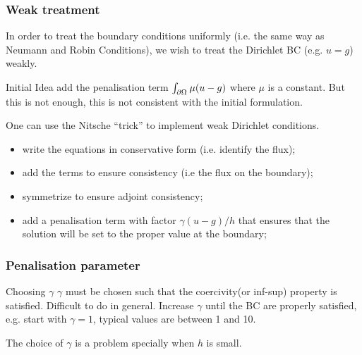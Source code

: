 \subsubsection{Weak treatment}
  In order to treat the boundary conditions uniformly (i.e. the same
  way as Neumann and Robin Conditions), we wish to treat the Dirichlet
  BC (e.g. $u=g$) weakly.

  \begin{remark}{Initial Idea}
    add the penalisation term $\int_{\partial {\ensuremath{\Omega^{}}}} \mu( u - g
    )$ where $\mu$ is a constant. But this is not enough, this is not consistent with the
    initial formulation.
  \end{remark}

  One can use the Nitsche ``trick'' to implement weak Dirichlet conditions.
  \begin{itemize}
  \item write the equations in conservative form (i.e. identify the flux);
  \item add the terms to ensure consistency (i.e the flux on the boundary);
  \item symmetrize to ensure adjoint consistency;
  \item add a penalisation term with factor $\gamma (u-g)/h$ that ensures
    that the solution will be set to the proper value at the boundary;
  \end{itemize}


\subsubsection{Penalisation parameter}
    \begin{remark}{Choosing $\gamma$}
    $\gamma$ must be chosen such that the coercivity(or inf-sup)
    property is satisfied. Difficult to do in general. Increase
    $\gamma$ until the BC are properly satisfied, e.g. start with
    $\gamma=1$, typical values are between 1 and 10.

    The choice of $\gamma$ is a problem specially when $h$ is small.
  \end{remark}



